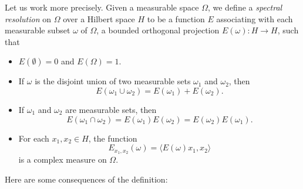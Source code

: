 Let us work more precisely. Given a measurable space $\Omega$, we define a \emph{spectral resolution} on $\Omega$ over a Hilbert space $H$ to be a function $E$ associating with each measurable subset $\omega$ of $\Omega$, a bounded orthogonal projection $E(\omega): H \to H$, such that
%
\begin{itemize}
    \item $E(\emptyset) = 0$ and $E(\Omega) = 1$.
    \item If $\omega$ is the disjoint union of two measurable sets $\omega_1$ and $\omega_2$, then
    \[ E(\omega_1 \cup \omega_2) = E(\omega_1) + E(\omega_2). \]

    \item If $\omega_1$ and $\omega_2$ are measurable sets, then
    \[ E(\omega_1 \cap \omega_2) = E(\omega_1) E(\omega_2) = E(\omega_2) E(\omega_1). \]

    \item For each $x_1,x_2 \in H$, the function
    \[ E_{x_1,x_2}(\omega) = \langle E(\omega) x_1, x_2 \rangle \]
    is a complex measure on $\Omega$.
\end{itemize}
%
Here are some consequences of the definition:
%
